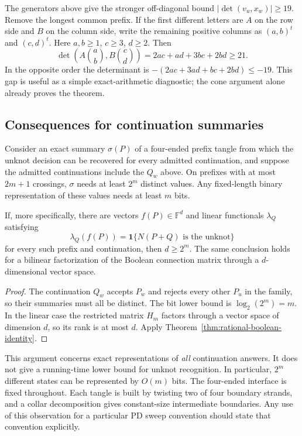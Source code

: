 \begin{remark}
The generators above give the stronger off-diagonal bound
$|\det(v_u,x_w)|\ge19$.  Remove the longest common prefix.  If the first
different letters are $A$ on the row side and $B$ on the column side,
write the remaining positive columns as $(a,b)^t$ and $(c,d)^t$.
Here $a,b\ge1$, $c\ge3$, $d\ge2$.  Then
\[
 \det\left(A\binom ab,B\binom cd\right)
 =2ac+ad+3bc+2bd\ge21.
\]
In the opposite order the determinant is
$-(2ac+3ad+bc+2bd)\le-19$.
This gap is useful as a simple exact-arithmetic diagnostic; the cone
argument alone already proves the theorem.
\end{remark}

\subsection{Consequences for continuation summaries}

\begin{corollary}
\label{cor:rational-summary-obstructions}
Consider an exact summary $\sigma(P)$ of a four-ended prefix tangle from
which the unknot decision can be recovered for every admitted continuation,
and suppose the admitted continuations include the $Q_w$ above.
On prefixes with at most $2m+1$ crossings, $\sigma$ needs at least $2^m$
distinct values.  Any fixed-length binary representation of these values
needs at least $m$ bits.

If, more specifically, there are vectors $f(P)\in\mathbb F^d$ and
linear functionals $\lambda_Q$ satisfying
\[
 \lambda_Q(f(P))=\mathbf 1\{N(P+Q)\text{ is the unknot}\}
\]
for every such prefix and continuation, then $d\ge2^m$.
The same conclusion holds for a bilinear factorization of the Boolean
connection matrix through a $d$-dimensional vector space.
\end{corollary}

\begin{proof}
The continuation $Q_w$ accepts $P_w$ and rejects every other $P_u$ in the
family, so their summaries must all be distinct.  The bit lower bound is
$\log_2(2^m)=m$.  In the linear case the restricted matrix $H_m$ factors
through a vector space of dimension $d$, so its rank is at most $d$.
Apply Theorem~\ref{thm:rational-boolean-identity}.
\end{proof}

This argument concerns exact representations of \emph{all} continuation
answers.  It does not give a running-time lower bound for unknot recognition.
In particular, $2^m$ different states can be represented by $O(m)$ bits.
The four-ended interface is fixed throughout.  Each tangle is built by
twisting two of four boundary strands, and a collar decomposition gives
constant-size intermediate boundaries.  Any use of this observation for a
particular PD sweep convention should state that convention explicitly.

